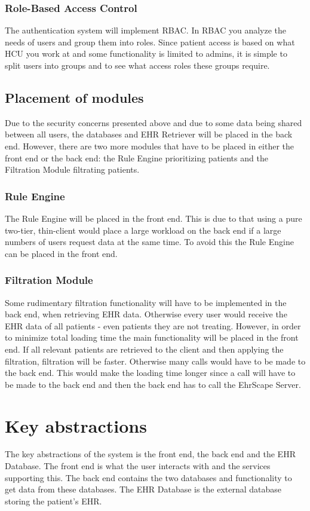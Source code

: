 \documentclass{article}
\begin{document}
\subsubsection{Role-Based Access Control}
The authentication system will implement RBAC. In RBAC you analyze the needs of users and group them into roles. Since patient access is based on what HCU you work at and some functionality is limited to admins, it is simple to split users into groups and to see what access roles these groups require.

\subsection{Placement of modules}\label{placement-modules}
Due to the security concerns presented above and due to some data being shared between all users, the databases and EHR Retriever will be placed in the back end. However, there are two more modules that have to be placed in either the front end or the back end: the Rule Engine prioritizing patients and the Filtration Module filtrating patients.

\subsubsection{Rule Engine}
The Rule Engine will be placed in the front end. This is due to that using a pure two-tier, thin-client would place a large workload on the back end if a large numbers of users request data at the same time. To avoid this the Rule Engine can be placed in the front end. 

\subsubsection{Filtration Module}
Some rudimentary filtration functionality will have to be implemented in the back end, when retrieving EHR data. Otherwise every user would receive the EHR data of all patients - even patients they are not treating. However, in order to minimize total loading time the main functionality will be placed in the front end. If all relevant patients are retrieved to the client and then applying the filtration, filtration will be faster. Otherwise many calls would have to be made to the back end. This would make the loading time longer since a call will have to be made to the back end and then the back end has to call the EhrScape Server.


\section{Key abstractions}
The key abstractions of the system is the front end, the back end and the EHR Database. The front end is what the user interacts with and the services supporting this. The back end contains the two databases and functionality to get data from these databases. The EHR Database is the external database storing the patient's EHR.
\end{document}
